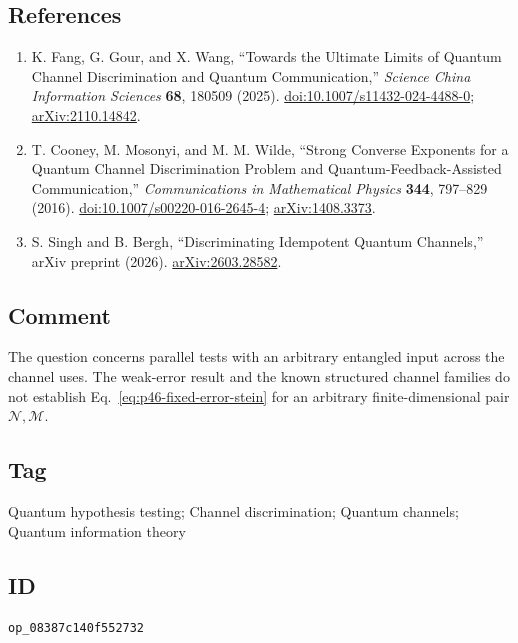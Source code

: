 \subsection*{References}

\begin{enumerate}[label={},leftmargin=4.8em,labelsep=0.5em]
  \footnotesize
  \item[\textup{[FGW25]}]\label{ref:p46-fang-gour-wang}
  K. Fang, G. Gour, and X. Wang,
  ``Towards the Ultimate Limits of Quantum Channel Discrimination and
  Quantum Communication,'' \emph{Science China Information Sciences}
  \textbf{68}, 180509 (2025).
  \href{https://doi.org/10.1007/s11432-024-4488-0}%
       {doi:10.1007/s11432-024-4488-0};
  \href{https://arxiv.org/abs/2110.14842}{arXiv:2110.14842}.

  \item[\textup{[CMW16]}]\label{ref:p46-cooney-mosonyi-wilde}
  T. Cooney, M. Mosonyi, and M. M. Wilde,
  ``Strong Converse Exponents for a Quantum Channel Discrimination Problem
  and Quantum-Feedback-Assisted Communication,''
  \emph{Communications in Mathematical Physics} \textbf{344}, 797--829
  (2016).
  \href{https://doi.org/10.1007/s00220-016-2645-4}%
       {doi:10.1007/s00220-016-2645-4};
  \href{https://arxiv.org/abs/1408.3373}{arXiv:1408.3373}.

  \item[\textup{[SB26]}]\label{ref:p46-singh-bergh}
  S. Singh and B. Bergh, ``Discriminating Idempotent Quantum Channels,''
  arXiv preprint (2026).
  \href{https://arxiv.org/abs/2603.28582}{arXiv:2603.28582}.
\end{enumerate}

\subsection*{Comment}

The question concerns parallel tests with an arbitrary entangled input across
the channel uses.  The weak-error result and the known structured channel
families do not establish Eq.~\eqref{eq:p46-fixed-error-stein} for an arbitrary
finite-dimensional pair $\mathcal N,\mathcal M$.

\subsection*{Tag}

Quantum hypothesis testing; Channel discrimination; Quantum channels;
Quantum information theory

\subsection*{ID}

\texttt{op\_08387c140f552732}
